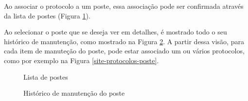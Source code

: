 \documentclass[
	article,			%
	11pt,				%
	oneside,			%
	a4paper,			%
	english,			%
	brazil,				%
	sumario=tradicional
	]{abntex2}
\begin{document}
Ao associar o protocolo a um poste, essa associação pode ser confirmada através da lista de postes (Figura \ref{site-lista-poste}).

Ao selecionar o poste que se deseja ver em detalhes, é mostrado todo o seu histórico de manutenção, como mostrado na Figura \ref{site-historico-manutencao}.
A partir dessa visão, para cada item de manuteção do poste, pode estar associado um ou vários protocolos, como por exemplo na Figura \ref{site-protocolos-poste}.

\begin{figure}[!htbp]
 \centering
 \caption{\label{site-lista-poste}Lista de postes}
\end{figure}

\begin{figure}[!htbp]
 \centering
 \caption{\label{site-historico-manutencao}Histórico de manutenção do poste}
\end{figure}
\end{document}
